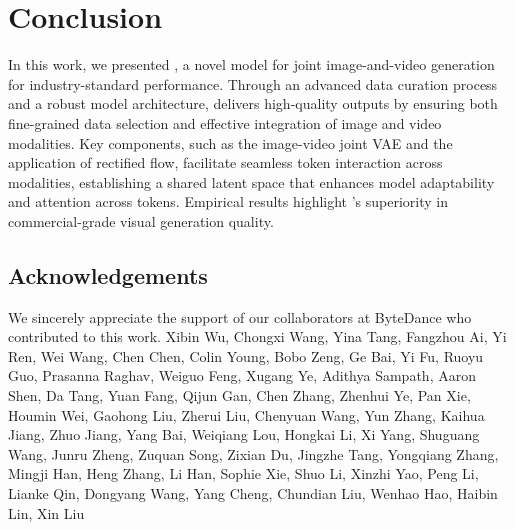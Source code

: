\section{Conclusion}
In this work, we presented \ours, a novel model for joint image-and-video generation for industry-standard performance. Through an advanced data curation process and a robust model architecture, \ours delivers high-quality outputs by ensuring both fine-grained data selection and effective integration of image and video modalities. Key components, such as the image-video joint VAE and the application of rectified flow, facilitate seamless token interaction across modalities, establishing a shared latent space that enhances model adaptability and attention across tokens. Empirical results highlight \ours's superiority in commercial-grade visual generation quality.

\subsection*{Acknowledgements}
We sincerely appreciate the support of our collaborators at ByteDance who contributed to this work. Xibin Wu, Chongxi Wang, Yina Tang, Fangzhou Ai, Yi Ren, Wei Wang, Chen Chen, Colin Young, Bobo Zeng, Ge Bai, Yi Fu, Ruoyu Guo, Prasanna Raghav, Weiguo Feng, Xugang Ye, Adithya Sampath, Aaron Shen, Da Tang, Yuan Fang, Qijun Gan, Chen Zhang, Zhenhui Ye, Pan Xie, Houmin Wei, Gaohong Liu, Zherui Liu, Chenyuan Wang, Yun Zhang, Kaihua Jiang, Zhuo Jiang, Yang Bai, Weiqiang Lou, Hongkai Li, Xi Yang, Shuguang Wang, Junru Zheng, Zuquan Song, Zixian Du, Jingzhe Tang, Yongqiang Zhang, Mingji Han, Heng Zhang, Li Han,  Sophie Xie, Shuo Li, Xinzhi Yao, Peng Li, Lianke Qin, Dongyang Wang, Yang Cheng, Chundian Liu, Wenhao Hao, Haibin Lin, Xin Liu 
